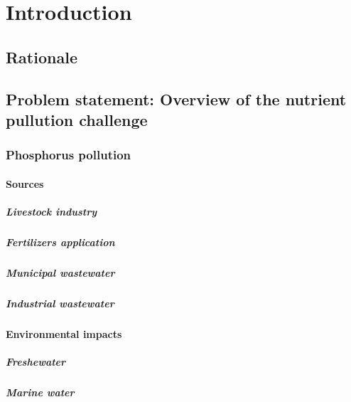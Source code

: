 \chapter{Introduction}\label{ch:introduction}
\section{Rationale}

\section{Problem statement: Overview of the nutrient pullution challenge}

\subsection{Phosphorus pollution}

\subsubsection{Sources}

\paragraph{Livestock industry}
\paragraph{Fertilizers application}
\paragraph{Municipal wastewater}
\paragraph{Industrial wastewater}

\subsubsection{Environmental impacts}

\paragraph{Freshewater}
\paragraph{Marine water}
